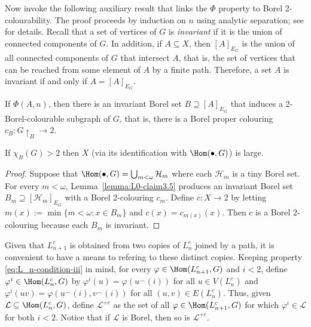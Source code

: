 \documentclass[12pt]{article}
\begin{document}
Now invoke the following auxiliary result that links the $\Phi$ property to Borel 2-colourability.
The proof proceeds by induction on $n$ using analytic separation; see \cite[Claims~3.3--3.5]{L0paper} for details.
Recall that a set of vertices of $G$ is \emph{invariant} if it is the union of connected components of $G$.
In addition, if $A\subseteq X$, then $[A]_{E_G}$ is the union of all connected components of $G$ that intersect $A$, that is, the set of vertices that can be reached from some element of $A$ by a finite path.
Therefore, a set $A$ is invariant if and only if $A=[A]_{E_G}$.

\begin{lemma}\label{lemma:L0-claim3.5}
    If $\Phi(A,n)$, then there is an invariant Borel set $B\supseteq[A]_{E_G}$ that induces a 2-Borel-colourable subgraph of $G$, that is, there is a Borel proper colouring $c_B\colon G\restriction_B\to2$.
\end{lemma}

\begin{proposition}\label{prop:small}
    If $\chi_B(G)>2$ then $X$ (via its identification with $\Hom(\bullet,G)$) is large.
\end{proposition}

\begin{proof}
    Suppose that $\Hom(\bullet,G)=\bigcup_{m<\omega}\mathcal H_m$ where each $\mathcal H_m$ is a tiny Borel set.
    For every $m<\omega$, Lemma~\ref{lemma:L0-claim3.5} produces an invariant Borel set $B_m\supseteq[\mathcal H_m]_{E_G}$ with a Borel 2-colouring $c_m$.
    Define $c\colon X\to2$ by letting $m(x):=\min\{m<\omega:x\in B_m\}$ and $c(x)=c_{m(x)}(x)$.
    Then $c$ is a Borel 2-colouring because each $B_m$ is invariant.
\end{proof}

Given that $L^c_{n+1}$ is obtained from two copies of $L^c_n$ joined by a path, it is convenient to have a means to refering to these distinct copies.
Keeping property \eqref{eq:L_n-condition-iii} in mind, for every $\varphi\in\Hom(L^c_{n+1},G)$ and $i<2$, define $\varphi^i\in\Hom(L^c_n,G)$ by $\varphi^i(u)=\varphi(u^\frown (i))$ for all $u\in V(L^c_n)$ and $\varphi^i(uv)=\varphi(u^\frown(i),v^\frown(i))$ for all $(u,v)\in E(L^c_n)$.
Thus, given $\mathcal L\subseteq\Hom(L^c_n,G)$, define $\mathcal L^{+c}$ as the set of all $\varphi\in\Hom(L^c_{n+1},G)$ for which $\varphi^i\in\mathcal L$ for both $i<2$.
Notice that if $\mathcal L$ is Borel, then so is $\mathcal L^{+c}$.
\end{document}
